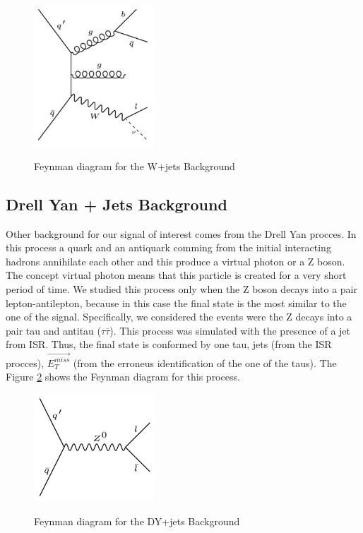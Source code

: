   
 \begin{figure}[h] 
 \centering
 \caption{Feynman diagram for the W+jets Background}
 \includegraphics[width=0.4\textwidth]{./Capitulos/Model/w+jets}  
 \label{w_jets_feynman}
 \end{figure}  

 \subsection{Drell Yan + Jets Background}
 
 Other background for our signal of interest comes from the Drell Yan procces. In this process a quark and an antiquark comming from the initial interacting hadrons annihilate each other and this
 produce a virtual photon or a Z boson. The concept virtual photon means that this particle is created for a very short period of time. We studied this process only when the Z boson decays into a 
 pair lepton-antilepton, because in this case the final state is the most similar to the one of the signal. Specifically, we considered the events were the Z decays into a pair 
 tau and antitau ($\tau \overline{\tau}$). This process was simulated with the presence of a jet from ISR. Thus, the final state is conformed by one tau, jets (from the ISR procces), 
 $\vec{E_T^{miss}}$ (from the erroneus identification of the one of the taus). The Figure \ref{dy_jets_feynman} shows the Feynman diagram for this process.
 
  \begin{figure}[h] 
 \centering
 \caption{Feynman diagram for the DY+jets Background}
 \includegraphics[width=0.4\textwidth]{./Capitulos/Model/DY+jets} 
 \label{dy_jets_feynman}
 \end{figure} 
 
